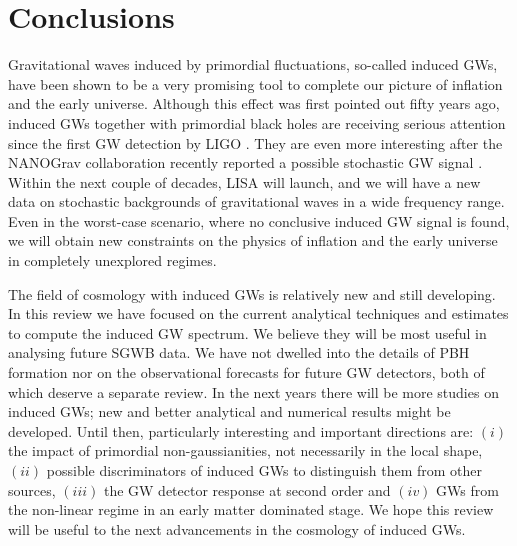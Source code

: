 \documentclass[a4paper,11pt]{article}
\numberwithin{equation}{section}
\begin{document}
\section{Conclusions \label{sec:conclusions}}

Gravitational waves induced by primordial fluctuations, so-called induced GWs, have been shown to be a very promising tool to complete our picture of inflation and the early universe. Although this effect was first pointed out fifty years ago, induced GWs together with primordial black holes are receiving serious attention since the first GW detection by LIGO \cite{Abbott:2016nmj}. They are even more interesting after the NANOGrav collaboration recently reported a possible stochastic GW signal \cite{Arzoumanian:2020vkk}. Within the next couple of decades, LISA will launch, and we will have a new data on stochastic backgrounds of gravitational waves in a wide frequency range. Even in the worst-case scenario, where no conclusive induced GW signal is found, we will obtain new constraints on the physics of inflation and the early universe in completely unexplored regimes.

The field of cosmology with induced GWs is relatively new and still developing. In this review we have focused on the current analytical techniques and estimates to compute the induced GW spectrum. We believe they will be most useful in analysing future SGWB data.  We have not dwelled into the details of PBH formation nor on the observational forecasts for future GW detectors, both of which deserve a separate review. In the next years there will be more studies on induced GWs; new and better analytical and numerical results might be developed. Until then, particularly interesting and important directions are: $(i)$ the impact of primordial non-gaussianities, not necessarily in the local shape, $(ii)$ possible discriminators of induced GWs to distinguish them from other sources, $(iii)$ the GW detector response at second order and $(iv)$ GWs from the non-linear regime in an early matter dominated stage. We hope this review will be useful to the next advancements in the cosmology of induced GWs.


\vspace{6pt} 


\end{document}
